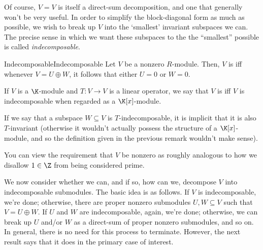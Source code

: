 Of course, $V=V$ is itself a direct-sum decomposition, and one that generally won't be very useful.  In order to simplify the block-diagonal form as much as possible, we wish to break up $V$ into the `smallest' invariant subspaces we can.  The precise sense in which we want these subspaces to the the ``smallest'' possible is called \emph{indecomposable}.
\begin{dfn}{Indecomposable}{Indecomposable}
	Let $V$ be a nonzero $R$-module.  Then, $V$ is  iff whenever $V=U\oplus W$, it follows that either $U=0$ or $W=0$.
	\begin{rmk}
		If $V$ is a $\K$-module and $T\colon V\rightarrow V$ is a linear operator, we say that $V$ is  iff $V$ is indecomposable when regarded as a $\K [x]$-module.
	\end{rmk}
	\begin{rmk}
		If we say that a subspace $W\subseteq V$ is $T$-indecomposable, it is implicit that it is also $T$-invariant (otherwise it wouldn't actually possess the structure of a $\K [x]$-module, and so the definition given in the previous remark wouldn't make sense).
	\end{rmk}
	\begin{rmk}
		You can view the requirement that $V$ be nonzero as roughly analogous to how we disallow $1\in \Z$ from being considered prime.
	\end{rmk}
\end{dfn}
We now consider whether we can, and if so, how can we, decompose $V$ into indecomposable submodules.  The basic idea is as follows.  If $V$ is indecomposable, we're done; otherwise, there are proper nonzero submodules $U,W\subseteq V$ such that $V=U\oplus W$.  If $U$ and $W$ are indecomposable, again, we're done; otherwise, we can break up $U$ and/or $W$ as a direct-sum of proper nonzero submodules, and so on.  In general, there is no need for this process to terminate.  However, the next result says that it does in the primary case of interest.
